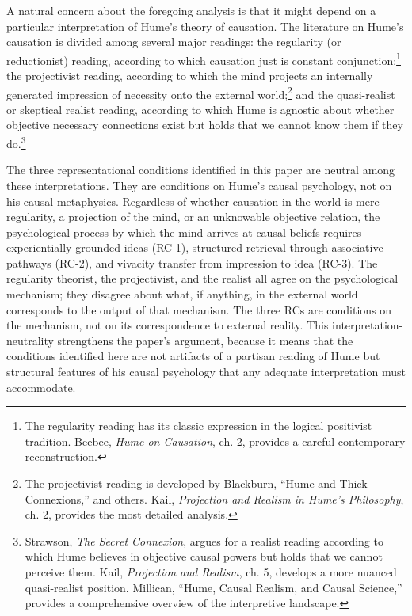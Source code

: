 \documentclass[11pt]{article}
\begin{document}
A natural concern about the foregoing analysis is that it might depend on a particular interpretation of Hume's theory of causation. The literature on Hume's causation is divided among several major readings: the regularity (or reductionist) reading, according to which causation just is constant conjunction;\footnote{The regularity reading has its classic expression in the logical positivist tradition. Beebee, \emph{Hume on Causation}, ch. 2, provides a careful contemporary reconstruction.} the projectivist reading, according to which the mind projects an internally generated impression of necessity onto the external world;\footnote{The projectivist reading is developed by Blackburn, ``Hume and Thick Connexions,'' and others. Kail, \emph{Projection and Realism in Hume's Philosophy}, ch. 2, provides the most detailed analysis.} and the quasi-realist or skeptical realist reading, according to which Hume is agnostic about whether objective necessary connections exist but holds that we cannot know them if they do.\footnote{Strawson, \emph{The Secret Connexion}, argues for a realist reading according to which Hume believes in objective causal powers but holds that we cannot perceive them. Kail, \emph{Projection and Realism}, ch. 5, develops a more nuanced quasi-realist position. Millican, ``Hume, Causal Realism, and Causal Science,'' provides a comprehensive overview of the interpretive landscape.}

The three representational conditions identified in this paper are neutral among these interpretations. They are conditions on Hume's causal psychology, not on his causal metaphysics. Regardless of whether causation in the world is mere regularity, a projection of the mind, or an unknowable objective relation, the psychological process by which the mind arrives at causal beliefs requires experientially grounded ideas (RC-1), structured retrieval through associative pathways (RC-2), and vivacity transfer from impression to idea (RC-3). The regularity theorist, the projectivist, and the realist all agree on the psychological mechanism; they disagree about what, if anything, in the external world corresponds to the output of that mechanism. The three RCs are conditions on the mechanism, not on its correspondence to external reality. This interpretation-neutrality strengthens the paper's argument, because it means that the conditions identified here are not artifacts of a partisan reading of Hume but structural features of his causal psychology that any adequate interpretation must accommodate.
\end{document}
